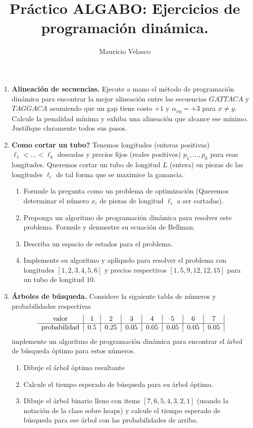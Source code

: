 \documentclass[12pt, a4paper]{article}
\date{}
\begin{document}
\title{Pr\'actico ALGABO: Ejercicios de programaci\'on dinámica.}
\author{Mauricio Velasco}
\maketitle{}
\begin{enumerate} 
\item {\bf Alineación de secuencias.} Ejecute a mano el método de programación dinámica para encontrar la mejor alineación entre las secuencias $GATTACA$ y $TAGGACA$ asumiendo que un gap tiene costo $+1$ y $\alpha_{xy}=+3$ para $x\neq y$. Calcule la penalidad mínima y exhiba una alineación que alcance ese mínimo. Justifique claramente todos sus pasos.

\item {\bf Como cortar un tubo?} Tenemos longitudes (enteras positivas) $\ell_1<\dots< \ell_k$ deseadas y precios fijos (reales positivos) $p_1,\dots, p_k$ para esas longitudes. Queremos cortar un tubo de longitud $L$ (entera) en piezas de las longitudes $\ell_i$ de tal forma que se maximice la ganancia.  
\begin{enumerate}
\item Formule la pregunta como un problema de optimización (Queremos determinar el número $x_i$ de piezas de longitud $\ell_i$ a ser cortadas). 
\item Proponga un algoritmo de programación dinámica para resolver este problema. Formule y demuestre su ecuación de Bellman.
\item Describa un espacio de estados para el problema.
\item Implemente su algoritmo y aplíquelo para resolver el problema con longitudes $[1,2,3,4,5,6]$ y precios respectivos $[1, 5, 9, 12, 12, 15]$ para un tubo de longitud $10$.
\end{enumerate}



\item {\bf Árboles de búsqueda.} Considere la siguiente tabla de números y probabilidades respectivas
\[
\begin{tabular}{c|c|c|c|c|c|c|c|c}
\text{valor} & 1 & 2 & 3 & 4 & 5 & 6 & 7\\
\hline
\text{probabilidad} & 0.5 & 0.25 & 0.05 & 0.05 & 0.05 & 0.05 & 0.05 \\ 
\end{tabular}
\]
implemente un algoritmo de programación dinámica para encontrar el árbol de búsqueda óptimo para estos números.
\begin{enumerate}
\item Dibuje el árbol \'optimo resultante
\item Calcule el tiempo esperado de búsqueda para su árbol óptimo.
\item Dibuje el árbol binario lleno con items $[7,6,5,4,3,2,1]$ (usando la notación de la clase sobre heaps) y calcule el tiempo esperado de búsqueda para ese árbol con las probabilidades de arriba.
\end{enumerate}


\end{enumerate}
\end{document}

